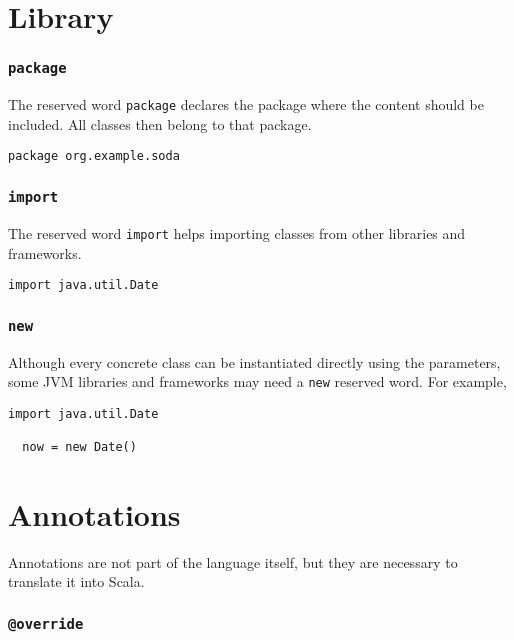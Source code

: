 \documentclass[12pt,a4paper]{book}
\makeatletter
\newcommand{\srccode}[1]{\texttt{{#1}}}
\newcommand{\reservedWord}[1]{{\color{blue}\srccode{#1}}\xspace}
\newcommand{\annotation}[1]{{\color{brown}\srccode{#1}}\xspace}
\newcommand{\spackage}{\reservedWord{package}}
\newcommand{\simport}{\reservedWord{import}}
\newcommand{\snew}{\reservedWord{new}}
\newcommand{\soverride}{\annotation{@override}}
\makeatother
\begin{document}
    \section{Library}

    \subsubsection{\spackage}

    The reserved word \spackage declares the package where the content should be included.
    All classes then belong to that package.

    \begin{lstlisting}[label={lst:examplePackage}]
  package org.example.soda
    \end{lstlisting}

    \subsubsection{\simport}

    The reserved word \simport helps importing classes from other libraries and frameworks.

    \begin{lstlisting}[label={lst:exampleImport}]
  import java.util.Date
    \end{lstlisting}

    \subsubsection{\snew}

    Although every concrete class can be instantiated directly using the parameters, some JVM libraries and frameworks may need a \snew reserved word.
    For example,

    \begin{lstlisting}[label={lst:exampleImportDate}]
  import java.util.Date

  now = new Date()
    \end{lstlisting}


    \section{Annotations}

    Annotations are not part of the language itself, but they are necessary to translate it into Scala.

    \subsubsection{\soverride}
\end{document}
